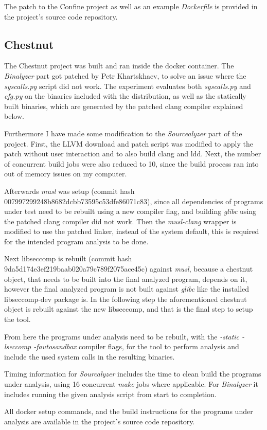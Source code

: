 The patch to the Confine project as well as an example \textit{Dockerfile} is provided in the project's source code repository.

\subsection {Chestnut}
The Chestnut \cite{ref_sp_1} project was built and ran inside the docker container. The \textit{Binalyzer} part got patched by Petr Khartskhaev, to solve an issue where the \textit{syscalls.py} script did not work.
The experiment evaluates both \textit{syscalls.py} and \textit{cfg.py} on the binaries included with the distribution, as well as the statically built binaries, which are generated by the patched clang compiler explained below.

Furthermore I have made some modification to the \textit{Sourcealyzer} part of the project. First, the LLVM download and patch script was modified to apply the patch without user interaction and to also build clang and ldd.
Next, the number of concurrent build jobs were also reduced to 10, since the build process ran into out of memory issues on my computer.

Afterwards \textit{musl} was setup (commit hash 007997299248b8682dcbb73595c53dfe86071c83), since all dependencies of programs under test need to be rebuilt using a new compiler flag, and building \textit{glibc} using the patched clang compiler did not work.
Then the \textit{musl-clang} wrapper is modified to use the patched linker, instead of the system default, this is required for the intended program analysis to be done.

Next libseccomp is rebuilt (commit hash 9da5d174e3ef219baab020a79c789f2075ace45c) against \textit{musl}, because a chestnut object, that needs to be built into the final analyzed program, depends on it, however the final analyzed program is not built against \textit{glibc} like the installed libseccomp-dev package is.
In the following step the aforementioned chestnut object is rebuilt against the new libseccomp, and that is the final step to setup the tool.

From here the programs under analysis need to be rebuilt, with the \textit{-static -lseccomp -fautosandbox} compiler flags, for the tool to perform analysis and include the used system calls in the resulting binaries.

Timing information for \textit{Sourcalyzer} includes the time to clean build the programs under analysis, using 16 concurrent \textit{make} jobs where applicable. For \textit{Binalyzer} it includes running the given analysis script from start to completion.

All docker setup commands, and the build instructions for the programs under analysis are available in the project's source code repository.
